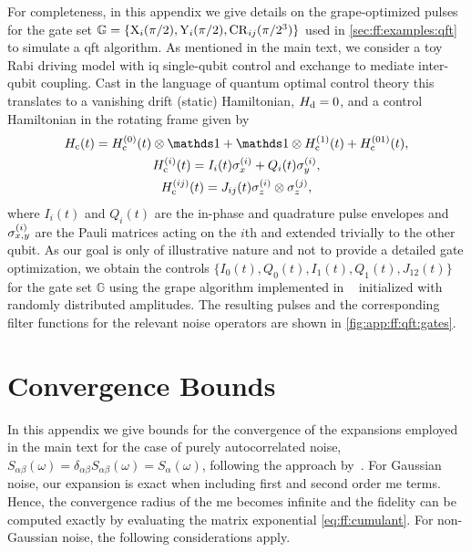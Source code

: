 For completeness, in this appendix we give details on the \gls{grape}-optimized pulses for the gate set $\mathbb{G} = \lbrace\mathrm{X}_{i}(\pi/2),\mathrm{Y}_{i}(\pi/2),\mathrm{CR}_{ij}(\pi/2^3)\rbrace$ used in \cref{sec:ff:examples:qft} to simulate a \gls{qft} algorithm.
As mentioned in the main text, we consider a toy Rabi driving model with \gls{iq} single-qubit control and exchange to mediate inter-qubit coupling.
Cast in the language of quantum optimal control theory this translates to a vanishing drift (static) Hamiltonian, $H_{\mathrm{d}} =  0$, and a control Hamiltonian in the rotating frame given by
\begin{gather}
    \Hc(t) = \Hc\gth{0}(t)\otimes\eye + \eye\otimes\Hc\gth{1}(t) + \Hc\gth{01}(t), \\
    \Hc\gth{i}(t) = I_i(t)\sx\gth{i} + Q_i(t)\sy\gth{i}, \\
    \Hc\gth{ij}(t) = J_{ij}(t)\sz\gth{i}\otimes\sz\gth{j},
\end{gather}
where $I_i(t)$ and $Q_i(t)$ are the in-phase and quadrature pulse envelopes and $\sigma_{x,y}^{(i)}$ are the Pauli matrices acting on the $i$th and extended trivially to the other qubit.
As our goal is only of illustrative nature and not to provide a detailed gate optimization, we obtain the controls $\lbrace I_0(t), Q_0(t), I_1(t), Q_1(t), J_{12}(t)\rbrace$ for the gate set $\mathbb{G}$ using the \gls{grape} algorithm implemented in \qutip~\cite{Johansson2012} initialized with randomly distributed amplitudes.
The resulting pulses and the corresponding filter functions for the relevant noise operators are shown in \cref{fig:app:ff:qft:gates}.

\section{Convergence Bounds}\label{sec:app:ff:convergence}
In this appendix we give bounds for the convergence of the expansions employed in the main text for the case of purely autocorrelated noise, $S_{\alpha\beta}(\omega) = \delta_{\alpha\beta}S_{\alpha\beta}(\omega) =  S_\alpha(\omega)$, following the approach by~\citet{Green2013}.
For Gaussian noise, our expansion is exact when including first and second order \acrfull{me} terms.
Hence, the convergence radius of the \gls{me} becomes infinite and the fidelity can be computed exactly by evaluating the matrix exponential \cref{eq:ff:cumulant}.
For non-Gaussian noise, the following considerations apply.
